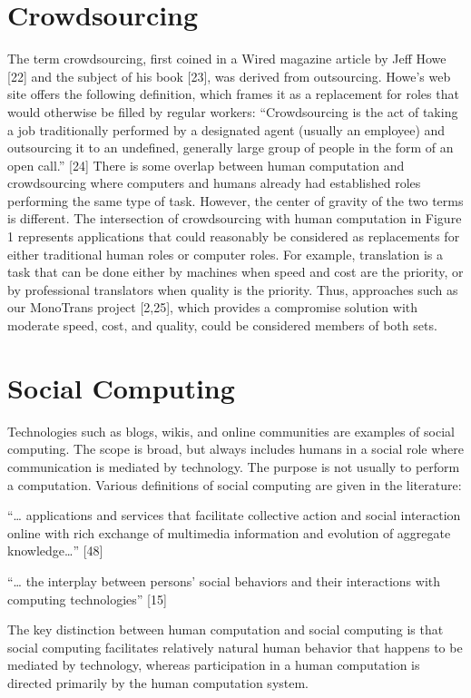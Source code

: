 \documentclass{acm_proc_article-sp} %
\begin{document}
\section{Crowdsourcing} The term crowdsourcing, first coined in a Wired magazine article by Jeff Howe [22] and the subject of his book [23], was derived from outsourcing. Howe’s web site offers the following definition, which frames it as a replacement for roles that would otherwise be filled by regular workers: “Crowdsourcing is the act of taking a job traditionally performed by a designated agent (usually an employee) and outsourcing it to an undefined, generally large group of people in the form of an open call.” [24] There is some overlap between human computation and crowdsourcing where computers and humans already had established roles performing the same type of task. However, the center of gravity of the  two terms is different. The intersection of crowdsourcing with human computation in Figure 1 represents applications that could reasonably be considered as replacements for either traditional human roles or computer roles. For example, translation is a task that can be done either by machines when speed and cost are the priority, or by professional translators when quality is the priority. Thus, approaches such as our MonoTrans project [2,25], which provides a compromise solution with moderate speed, cost, and quality, could be considered members of both sets. 

\section{Social Computing} Technologies such as blogs, wikis, and online communities are examples of social computing.  The scope is broad, but always includes humans in a social role where communication is mediated by technology.  The purpose is not usually to perform a computation.  Various definitions of social computing are given in the literature: 

“… applications and services that facilitate collective action and social interaction online with rich exchange of multimedia information and evolution of aggregate knowledge…” [48] 

“… the interplay between persons' social behaviors and their interactions with computing technologies” [15]

The key distinction between human computation and social computing is that social computing facilitates relatively natural human behavior that happens to be mediated by technology, whereas participation in a human computation is directed primarily by the human computation system. 
\end{document}
